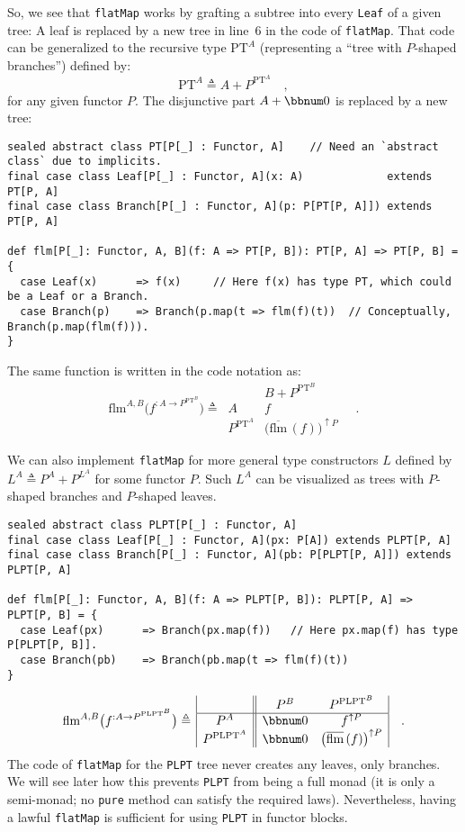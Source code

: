 So, we see that \lstinline!flatMap! works by grafting a subtree into
every \lstinline!Leaf! of a given tree: A leaf is replaced by a new
tree in line~6 in the code of \lstinline!flatMap!. That code can
be generalized to the recursive type $\text{PT}^{A}$ (representing
a \textsf{``}tree with $P$-shaped branches\textsf{''}) defined by:
\[
\text{PT}^{A}\triangleq A+P^{\text{PT}^{A}}\quad,
\]
for any given functor $P$. The disjunctive part $A+\bbnum 0$ is
replaced by a new tree:
\begin{lstlisting}
sealed abstract class PT[P[_] : Functor, A]    // Need an `abstract class` due to implicits.
final case class Leaf[P[_] : Functor, A](x: A)             extends PT[P, A]
final case class Branch[P[_] : Functor, A](p: P[PT[P, A]]) extends PT[P, A]

def flm[P[_]: Functor, A, B](f: A => PT[P, B]): PT[P, A] => PT[P, B] = {
  case Leaf(x)      => f(x)     // Here f(x) has type PT, which could be a Leaf or a Branch.
  case Branch(p)    => Branch(p.map(t => flm(f)(t))  // Conceptually, Branch(p.map(flm(f))). 
}
\end{lstlisting}
The same function is written in the code notation as:
\[
\text{flm}^{A,B}\big(f^{:A\rightarrow P^{\text{PT}^{B}}}\big)\triangleq\,\begin{array}{|c||c|}
 & B+P^{\text{PT}^{B}}\\
\hline A & f\\
P^{\text{PT}^{A}} & \big(\overline{\text{flm}}\,(f)\big)^{\uparrow P}
\end{array}\quad.
\]

We can also implement \lstinline!flatMap! for more general type constructors
$L$ defined by $L^{A}\triangleq P^{A}+P^{L^{A}}$ for some functor
$P$. Such $L^{A}$ can be visualized as trees with $P$-shaped branches
and $P$-shaped leaves.
\begin{lstlisting}
sealed abstract class PLPT[P[_] : Functor, A]
final case class Leaf[P[_] : Functor, A](px: P[A]) extends PLPT[P, A]
final case class Branch[P[_] : Functor, A](pb: P[PLPT[P, A]]) extends PLPT[P, A]

def flm[P[_]: Functor, A, B](f: A => PLPT[P, B]): PLPT[P, A] => PLPT[P, B] = {
  case Leaf(px)      => Branch(px.map(f))   // Here px.map(f) has type P[PLPT[P, B]].
  case Branch(pb)    => Branch(pb.map(t => flm(f)(t))
}
\end{lstlisting}
\[
\text{flm}^{A,B}\big(f^{:A\rightarrow P^{\text{PLPT}^{B}}}\big)\triangleq\,\begin{array}{|c||cc|}
 & P^{B} & P^{\text{PLPT}^{B}}\\
\hline P^{A} & \bbnum 0 & f^{\uparrow P}\\
P^{\text{PLPT}^{A}} & \bbnum 0 & \big(\overline{\text{flm}}\,(f)\big)^{\uparrow P}
\end{array}\quad.
\]
The code of \lstinline!flatMap! for the \lstinline!PLPT! tree never
creates any leaves, only branches. We will see later how this prevents
\lstinline!PLPT! from being a full monad (it is only a semi-monad;
no \lstinline!pure! method can satisfy the required laws). Nevertheless,
having a lawful \lstinline!flatMap! is sufficient for using \lstinline!PLPT!
in functor blocks.

